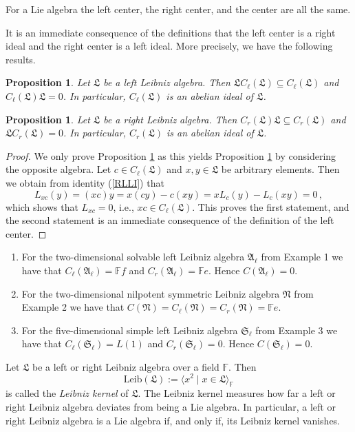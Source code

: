 \documentclass{amsart}
\newtheorem{pro}[thm]{Proposition}
\numberwithin{equation}{section}
\newcommand{\leib}{\mathrm{Leib}}
\newcommand{\F}{\mathbb{F}}
\newcommand{\af}{\mathfrak{A}}
\newcommand{\Sf}{\mathfrak{S}}
\newcommand{\lf}{\mathfrak{L}}
\newcommand{\nf}{\mathfrak{N}}
\begin{document}
 For a Lie algebra the left center, the right center, and the center are
all the same.
\vspace{.2cm}

It is an immediate consequence of the definitions that the left center is a right ideal and the
right center is a left ideal. More precisely, we have the following results.

\begin{pro}\label{leftcen}
Let $\lf$ be a left Leibniz algebra. Then $\lf C_\ell(\lf)\subseteq C_\ell(\lf)$ and $C_\ell(\lf)\lf
=0$. In particular, $C_\ell(\lf)$ is an abelian ideal of $\lf$.
\end{pro}

\begin{pro}\label{rightcen}
Let $\lf$ be a right Leibniz algebra. Then $C_r(\lf)\lf\subseteq C_r(\lf)$ and $\lf C_r(\lf)=0$.
In particular, $C_r(\lf)$ is an abelian ideal of $\lf$.
\end{pro}

\begin{proof}
We only prove Proposition \ref{leftcen} as this yields Proposition \ref{rightcen} by considering
the opposite algebra. Let $c\in C_\ell(\lf)$ and $x,y\in\lf$ be arbitrary elements. Then we obtain
from identity (\ref{RLLI}) that $$L_{xc}(y)=(xc)y=x(cy)-c(xy)=xL_c(y)-L_c(xy)=0\,,$$ which
shows that $L_{xc}=0$, i.e., $xc\in C_\ell(\lf)$. This proves the first statement, and the second
statement is an immediate consequence of the definition of the left center.
\end{proof}

\begin{enumerate}
\item[(1)] For the two-dimensional solvable left Leibniz algebra $\af_\ell$ from Example 1 we
                have that $C_\ell(\af_\ell)=\F f$ and $C_r(\af_\ell)=\F e$. Hence $C(\af_\ell)=0$.
\item[(2)] For the two-dimensional nilpotent symmetric Leibniz algebra $\nf$ from Example 2
                we have that $C(\nf)=C_\ell(\nf)=C_r(\nf)=\F e$.
\item[(3)] For the five-dimensional simple left Leibniz algebra $\Sf_\ell$ from Example 3 we have
                that $C_\ell(\Sf_\ell)=L(1)$ and $C_r(\Sf_\ell)=0$. Hence $C(\Sf_\ell)=0$.
\end{enumerate}
\vspace{.2cm}

Let $\lf$ be a left or right Leibniz algebra over a field $\F$. Then $$\leib(\lf):=\langle x^2\mid x
\in\lf\rangle_\mathbb{F}$$ is called the {\em Leibniz kernel\/} of $\mathfrak{L}$. The Leibniz
kernel measures how far a left or right Leibniz algebra deviates from being a Lie algebra. In
particular, a left or right Leibniz algebra is a Lie algebra if, and only if, its Leibniz kernel vanishes.
\end{document}
